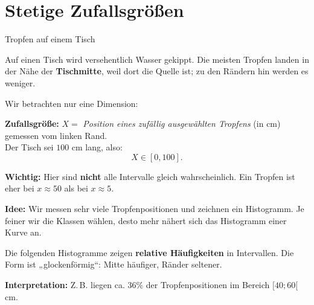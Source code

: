\section{Stetige Zufallsgrößen}
\begin{bsp}{Tropfen auf einem Tisch}{}

Auf einen Tisch wird versehentlich Wasser gekippt. Die meisten Tropfen landen in der Nähe der \textbf{Tischmitte}, weil dort die Quelle ist; zu den Rändern hin werden es weniger.

Wir betrachten nur eine Dimension:

\textbf{Zufallsgröße:} $X =$ \emph{Position eines zufällig ausgewählten Tropfens} (in cm) gemessen vom linken Rand.\\
Der Tisch sei $100$ cm lang, also:
\[
X \in [0,100].
\]

\textbf{Wichtig:} Hier sind \textbf{nicht} alle Intervalle gleich wahrscheinlich. Ein Tropfen ist eher bei $x\approx 50$ als bei $x\approx 5$.

\textbf{Idee:} Wir messen sehr viele Tropfenpositionen und zeichnen ein Histogramm. Je feiner wir die Klassen wählen, desto mehr nähert sich das Histogramm einer Kurve an.

Die folgenden Histogramme zeigen \textbf{relative Häufigkeiten} in Intervallen. Die Form ist „glockenförmig“: Mitte häufiger, Ränder seltener.

\begin{center}
\end{center}

\textbf{Interpretation:} Z.\,B. liegen ca. $36\%$ der Tropfenpositionen im Bereich $[40;60[$ cm.
\begin{center}
\end{center}


\end{bsp}
